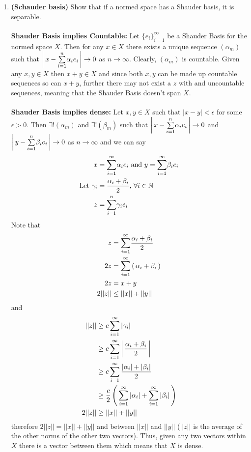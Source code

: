 \documentclass[10pt,a4paper]{report}
\begin{document}
\begin{enumerate}
	\item \textbf{(Schauder basis)} Show that if a normed space has a Shauder basis, it is separable.\\
	\\
	\textbf{Shauder Basis implies Countable:} Let $\{ e_i \}_{i=1}^\infty$ be a Shauder Basis for the normed space $X$.  Then for any $x \in X$ there exists a unique sequence $(\alpha_m)$ such that $\left |\, x - \underset{i=1}{\overset{n}{\sum}} \alpha_i e_i \,\right | \to 0$ as $n \to \infty$.  Clearly, $(\alpha_m)$ is countable.  Given any $x,y \in X$ then $x+y \in X$ and since both $x,y$ can be made up countable sequences so can $x+y$, further there may not exist a $z$ with and uncountable sequences, meaning that the Shauder Basis doesn't span $X$.\\ \\
	\textbf{Shauder Basis implies dense:}  Let $x,y \in X$ such that $|x-y|<\epsilon$ for some $\epsilon > 0$.  Then $\exists! (\alpha_m)$ and $\exists! (\beta_m)$ such that $\left |\, x - \underset{i=1}{\overset{n}{\sum}} \alpha_i e_i \,\right | \to 0$ and $\left |\, y - \underset{i=1}{\overset{n}{\sum}} \beta_i e_i \,\right | \to 0$ as $n \to \infty$ and we can say
	\begin{align*}
		x &= \underset{i=1}{\overset{\infty}{\sum}} \alpha_i e_i \text{ and } y = \underset{i=1}{\overset{\infty}{\sum}} \beta_i e_i\\
		\text{Let } \gamma_i &= \frac{\alpha_i + \beta_i}{2}, \, \forall i \in \mathbb{N} \\
		z &= \underset{i=1}{\overset{n}{\sum}} \gamma_i e_i 
	\end{align*}Note that
	\begin{align*}
		z &= \underset{i=1}{\overset{\infty}{\sum}} \frac{\alpha_i + \beta_i}{2} \\
		2z &= \underset{i=1}{\overset{\infty}{\sum}}\left (\,  \alpha_i + \beta_i  \,\right ) \\
		2z &= x+y \\
		2|| z || &\le ||x||+||y||
	\end{align*}and 
	\begin{align*}	
		|| z || &\ge c\sum_{i=1}^\infty | \gamma_i| \\
			&\ge c\sum_{i=1}^\infty \left |\, \frac{\alpha_i + \beta_i}{2} \,\right | \\
			&\ge c\sum_{i=1}^\infty \frac{|\alpha_i| + |\beta_i|}{2} \\
			&\ge \frac{c}{2} \left (\, \sum_{i=1}^\infty |\alpha_i| + \sum_{i=1}^\infty|\beta_i|  \,\right ) \\
		2|| z|| &\ge ||x|| + ||y|| \\
	\end{align*} therefore $2||z||=||x|| + ||y||$ and between $||x||$ and $||y||$ ($||z||$ is the average of the other norms of the other two vectors).  Thus, given any two vectors within $X$ there is a vector between them which means that $X$ is dense.
	

\end{enumerate}
\end{document}
